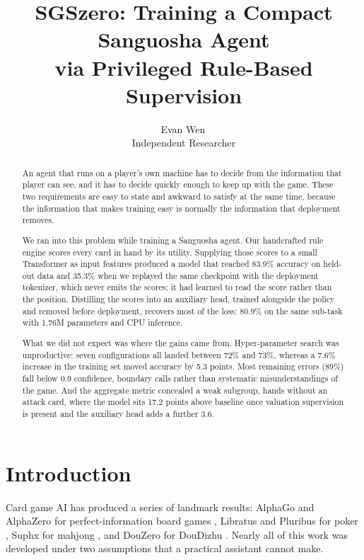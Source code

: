 \documentclass[11pt]{article}
\title{\bf SGSzero: Training a Compact Sanguosha Agent\\ via Privileged Rule-Based Supervision}
\author{
Evan Wen\,\orcidlink{0009-0005-7254-8002}\\
Independent Researcher
}
\date{}
\begin{document}
\maketitle

\begin{abstract}
An agent that runs on a player's own machine has to decide from the information that
player can see, and it has to decide quickly enough to keep up with the game. These two
requirements are easy to state and awkward to satisfy at the same time, because the
information that makes training easy is normally the information that deployment removes.

We ran into this problem while training a Sanguosha agent. Our handcrafted rule engine
scores every card in hand by its utility. Supplying those scores to a small Transformer as
input features produced a model that reached 83.9\% accuracy on held-out data and 35.3\%
when we replayed the same checkpoint with the deployment tokenizer, which never emits the
scores; it had learned to read the score rather than the position. Distilling the scores
into an auxiliary head, trained alongside the policy and removed before deployment, recovers
most of the loss: 80.9\% on the same sub-task with 1.76M parameters and CPU inference.

What we did not expect was where the gains came from. Hyper-parameter search was
unproductive: seven configurations all landed between 72\% and 73\%, whereas a 7.6\%
increase in the training set moved accuracy by 5.3 points. Most remaining errors (89\%) fall
below 0.9 confidence, boundary calls rather than systematic misunderstandings of the game.
And the aggregate metric concealed a weak subgroup, hands without an attack card, where the
model sits 17.2 points above baseline once valuation supervision is present and the auxiliary
head adds a further 3.6.
\end{abstract}

\section{Introduction}

Card game AI has produced a series of landmark results: AlphaGo and AlphaZero for
perfect-information board games \cite{silver2016,silver2018}, Libratus and Pluribus for
poker \cite{brown2018,brown2019}, Suphx for mahjong \cite{li2020suphx}, and DouZero for
DouDizhu \cite{zha2021douzero}. Nearly all of this work was developed under two
assumptions that a practical assistant cannot make.
\end{document}
